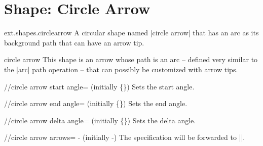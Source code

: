 %
%
%
\section{Shape: Circle Arrow}
\begin{pgflibrary}{ext.shapes.circlearrow}
  A circular shape named |circle arrow| that has an arc as its background path that can have an arrow tip.
\end{pgflibrary}
\begin{ext_shape}{circle arrow}
  This shape is an arrow whose path is an arc -- defined very similar to the |arc|%
   path operation -- that can possibly be customized with
  arrow tips.
  
  \begin{key}{/\pgfext/circle arrow start angle= (initially \{\})}
  Sets the start angle.
  \end{key}
  \begin{key}{/\pgfext/circle arrow end angle= (initially \{\})}
  Sets the end angle.
  \end{key}
  \begin{key}{/\pgfext/circle arrow delta angle= (initially \{\})}
  Sets the delta angle.
  \end{key}
  \begin{key}{/\pgfext/circle arrow arrows=%
    - (initially -)}
  The specification will be forwarded to |\pgfsetarrows|\indexCommandO{\pgfsetarrows}.
  \end{key}
  

\end{ext_shape}
